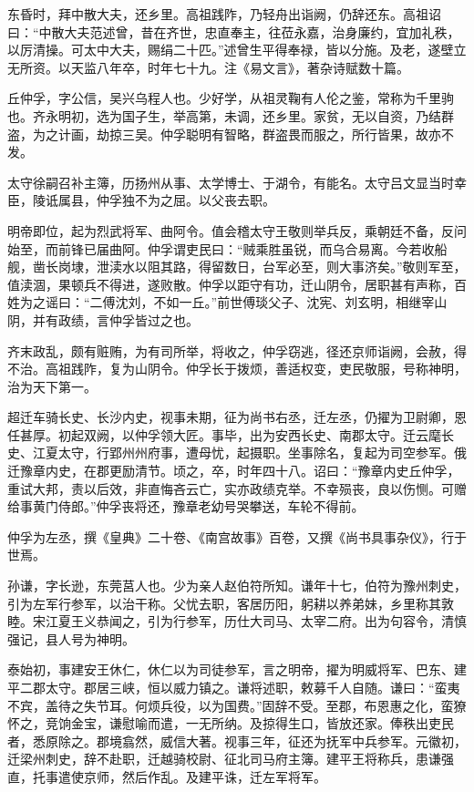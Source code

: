 \documentclass[12pt,UTF8]{ctexbook}
\begin{document}
东昏时，拜中散大夫，还乡里。高祖践阼，乃轻舟出诣阙，仍辞还东。高祖诏曰：“中散大夫范述曾，昔在齐世，忠直奉主，往莅永嘉，治身廉约，宜加礼秩，以厉清操。可太中大夫，赐绢二十匹。”述曾生平得奉禄，皆以分施。及老，遂壁立无所资。以天监八年卒，时年七十九。注《易文言》，著杂诗赋数十篇。

丘仲孚，字公信，吴兴乌程人也。少好学，从祖灵鞠有人伦之鉴，常称为千里驹也。齐永明初，选为国子生，举高第，未调，还乡里。家贫，无以自资，乃结群盗，为之计画，劫掠三吴。仲孚聪明有智略，群盗畏而服之，所行皆果，故亦不发。

太守徐嗣召补主簿，历扬州从事、太学博士、于湖令，有能名。太守吕文显当时幸臣，陵诋属县，仲孚独不为之屈。以父丧去职。

明帝即位，起为烈武将军、曲阿令。值会稽太守王敬则举兵反，乘朝廷不备，反问始至，而前锋已届曲阿。仲孚谓吏民曰：“贼乘胜虽锐，而乌合易离。今若收船舰，凿长岗埭，泄渎水以阻其路，得留数日，台军必至，则大事济矣。”敬则军至，值渎涸，果顿兵不得进，遂败散。仲孚以距守有功，迁山阴令，居职甚有声称，百姓为之谣曰：“二傅沈刘，不如一丘。”前世傅琰父子、沈宪、刘玄明，相继宰山阴，并有政绩，言仲孚皆过之也。

齐末政乱，颇有赃贿，为有司所举，将收之，仲孚窃逃，径还京师诣阙，会赦，得不治。高祖践阼，复为山阴令。仲孚长于拨烦，善适权变，吏民敬服，号称神明，治为天下第一。

超迁车骑长史、长沙内史，视事未期，征为尚书右丞，迁左丞，仍擢为卫尉卿，恩任甚厚。初起双阙，以仲孚领大匠。事毕，出为安西长史、南郡太守。迁云麾长史、江夏太守，行郢州州府事，遭母忧，起摄职。坐事除名，复起为司空参军。俄迁豫章内史，在郡更励清节。顷之，卒，时年四十八。诏曰：“豫章内史丘仲孚，重试大邦，责以后效，非直悔吝云亡，实亦政绩克举。不幸殒丧，良以伤恻。可赠给事黄门侍郎。”仲孚丧将还，豫章老幼号哭攀送，车轮不得前。

仲孚为左丞，撰《皇典》二十卷、《南宫故事》百卷，又撰《尚书具事杂仪》，行于世焉。

孙谦，字长逊，东莞莒人也。少为亲人赵伯符所知。谦年十七，伯符为豫州刺史，引为左军行参军，以治干称。父忧去职，客居历阳，躬耕以养弟妹，乡里称其敦睦。宋江夏王义恭闻之，引为行参军，历仕大司马、太宰二府。出为句容令，清慎强记，县人号为神明。

泰始初，事建安王休仁，休仁以为司徒参军，言之明帝，擢为明威将军、巴东、建平二郡太守。郡居三峡，恒以威力镇之。谦将述职，敕募千人自随。谦曰：“蛮夷不宾，盖待之失节耳。何烦兵役，以为国费。”固辞不受。至郡，布恩惠之化，蛮獠怀之，竞饷金宝，谦慰喻而遣，一无所纳。及掠得生口，皆放还家。俸秩出吏民者，悉原除之。郡境翕然，威信大著。视事三年，征还为抚军中兵参军。元徽初，迁梁州刺史，辞不赴职，迁越骑校尉、征北司马府主簿。建平王将称兵，患谦强直，托事遣使京师，然后作乱。及建平诛，迁左军将军。
\end{document}
